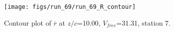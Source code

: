 \begin{figure}[H]
\centering
\texttt{[image: figs/run\_69/run\_69\_R\_contour]}
\caption{Contour plot of $\overline{r}$ at $z/c$=10.00, $V_{free}$=31.31, station 7.}
\end{figure}


